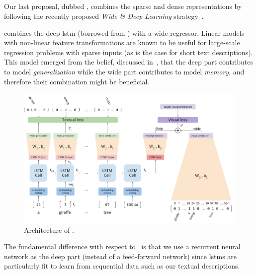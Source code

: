 \subsection{\widedeepttv{}}
\label{subsec:t2v:wd-t2v}

Our last proposal, dubbed \widedeepttv{}, combines the sparse and dense representations by following the recently proposed \emph{Wide \& Deep Learning} strategy~\cite{cheng2016wide}.

\widedeepttv{} combines the deep \gls{lstm} (borrowed from \densettv{}) with a wide regressor.
Linear models with non-linear feature transformations are known to be useful for large-scale regression problems with sparse inputs (as is the case for short text descriptions).
This model emerged from the belief, discussed in~\cite{cheng2016wide}, that the deep part contributes to model \emph{generalization} while the wide part contributes to model \emph{memory}, and therefore their combination might be beneficial.

\begin{figure}
\includegraphics[width=\linewidth]{wd-t2v-arch}
\caption{Architecture of \widedeepttv{}.}
\label{fig:t2v:widendeep}
\end{figure}

The fundamental difference with respect to~\cite{cheng2016wide} is that we use a recurrent neural network as the deep part (instead of a feed-forward network) since \glspl{lstm} are particularly fit to learn from sequential data such as our textual descriptions.

